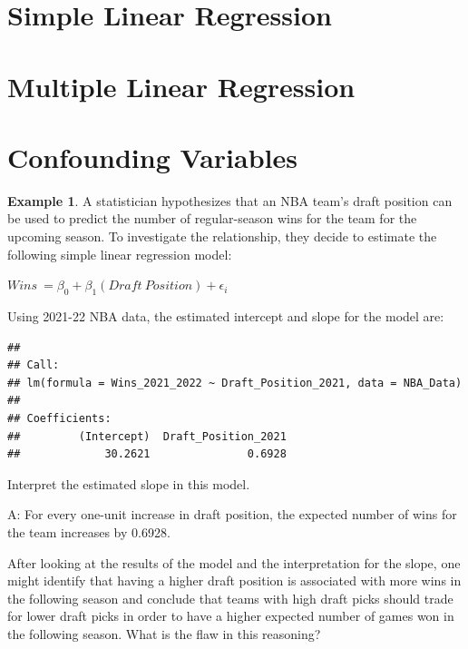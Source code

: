 \documentclass[
  11pt,
]{book}
\theoremstyle{definition}
\theoremstyle{definition}
\newtheorem{example}{Example}[chapter]
\theoremstyle{definition}
\theoremstyle{definition}
\theoremstyle{remark}
\begin{document}
\hypertarget{simple-linear-regression}{%
\section{Simple Linear Regression}\label{simple-linear-regression}}

\hypertarget{multiple-linear-regression}{%
\section{Multiple Linear Regression}\label{multiple-linear-regression}}

\hypertarget{confounding-variables}{%
\section{Confounding Variables}\label{confounding-variables}}

\begin{example}
A statistician hypothesizes that an NBA team's draft position can be used to predict the number of regular-season wins for the team for the upcoming season. To investigate the relationship, they decide to estimate the following simple linear regression model:

\(Wins\ = \beta_0 + \beta_1(Draft\ Position) + \epsilon_i\)

Using 2021-22 NBA data, the estimated intercept and slope for the model are:

\begin{verbatim}
## 
## Call:
## lm(formula = Wins_2021_2022 ~ Draft_Position_2021, data = NBA_Data)
## 
## Coefficients:
##         (Intercept)  Draft_Position_2021  
##             30.2621               0.6928
\end{verbatim}

Interpret the estimated slope in this model.
\end{example}

A: For every one-unit increase in draft position, the expected number of wins for the team increases by 0.6928.

After looking at the results of the model and the interpretation for the slope, one might identify that having a higher draft position is associated with more wins in the following season and conclude that teams with high draft picks should trade for lower draft picks in order to have a higher expected number of games won in the following season. What is the flaw in this reasoning?

\(~\)
\end{document}
